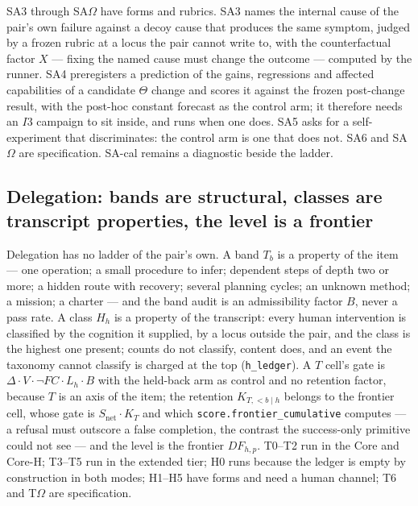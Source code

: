 SA3 through SA$\Omega$ have forms and rubrics. SA3 names the internal cause of the pair's own failure against a decoy cause that produces the same symptom, judged by a frozen rubric at a locus the pair cannot write to, with the counterfactual factor $X$ --- fixing the named cause must change the outcome --- computed by the runner. SA4 preregisters a prediction of the gains, regressions and affected capabilities of a candidate $\Theta$ change and scores it against the frozen post-change result, with the post-hoc constant forecast as the control arm; it therefore needs an $I3$ campaign to sit inside, and runs when one does. SA5 asks for a self-experiment that discriminates: the control arm is one that does not. SA6 and SA$\Omega$ are specification. SA-cal remains a diagnostic beside the ladder.

\subsection{Delegation: bands are structural, classes are transcript properties, the level is a frontier}\label{sec:dicells}
Delegation has no ladder of the pair's own. A band $T_b$ is a property of the item --- one operation; a small procedure to infer; dependent steps of depth two or more; a hidden route with recovery; several planning cycles; an unknown method; a mission; a charter --- and the band audit is an admissibility factor $B$, never a pass rate. A class $H_h$ is a property of the transcript: every human intervention is classified by the cognition it supplied, by a locus outside the pair, and the class is the highest one present; counts do not classify, content does, and an event the taxonomy cannot classify is charged at the top (\texttt{h\_ledger}). A $T$ cell's gate is $\Delta \cdot V \cdot \neg FC \cdot L_h \cdot B$ with the held-back arm as control and no retention factor, because $T$ is an axis of the item; the retention $K_{T,<b \mid h}$ belongs to the frontier cell, whose gate is $S_{\mathrm{net}} \cdot K_T$ and which \texttt{score.frontier\_cumulative} computes --- a refusal must outscore a false completion, the contrast the success-only primitive could not see --- and the level is the frontier $DF_{h,p}$. T0--T2 run in the Core and Core-H; T3--T5 run in the extended tier; H0 runs because the ledger is empty by construction in both modes; H1--H5 have forms and need a human channel; T6 and T$\Omega$ are specification.

